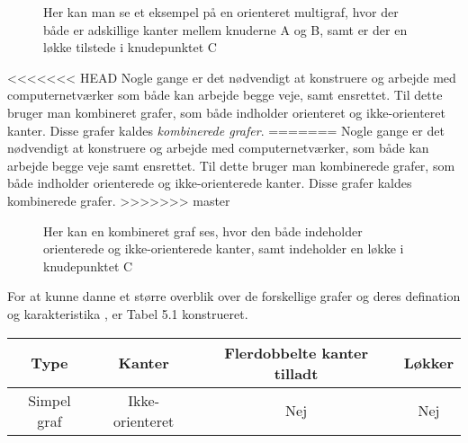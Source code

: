 \begin{defn}
\begin{figure}[h]
\caption{Her kan man se et eksempel på en orienteret multigraf, hvor der både er adskillige kanter mellem knuderne A og B, samt er der en løkke tilstede i knudepunktet C }
\end{figure}

<<<<<<< HEAD
\noindent Nogle gange er det nødvendigt at konstruere og arbejde med computernetværker som både kan arbejde begge veje, samt ensrettet. Til dette bruger man kombineret grafer, som både indholder orienteret og ikke-orienteret kanter. Disse grafer kaldes \textit{kombinerede grafer}.
=======
\noindent Nogle gange er det nødvendigt at konstruere og arbejde med computernetværker, som både kan arbejde begge veje samt ensrettet. Til dette bruger man kombinerede grafer, som både indholder orienterede og ikke-orienterede kanter. Disse grafer kaldes kombinerede grafer.
>>>>>>> master

\begin{figure}[!h]
\centering
{}
\caption{Her kan en kombineret graf ses, hvor den både indeholder orienterede og ikke-orienterede kanter, samt indeholder en løkke i knudepunktet C}
\end{figure}

\noindent For at kunne danne et større overblik over de forskellige grafer og deres defination og karakteristika , er Tabel 5.1 konstrueret.

\begin{table}[h]
\begin{tabular}{|c|c|c|c|}
\hline 
Type & Kanter & Flerdobbelte kanter tilladt & Løkker \\ 
\hline
Simpel graf & Ikke-orienteret & Nej & Nej	 \\ 


\end{tabular}
\end{table}
\end{defn}

